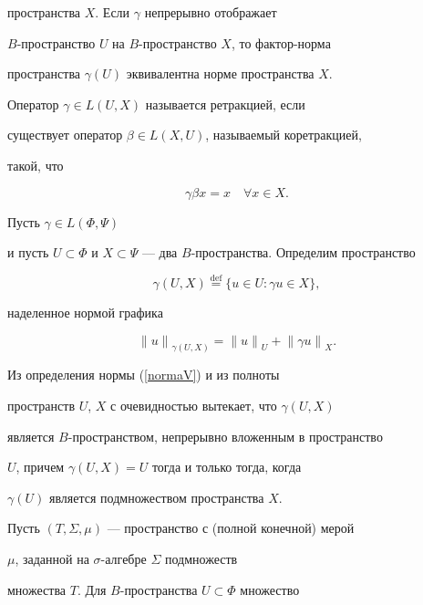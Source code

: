 пространства $X$. Если $\gamma$ непрерывно отображает


$B$-пространство $U$ на $B$-пространство $X$, то фактор-норма


пространства $\gamma (U)$ эквивалентна норме пространства $X$.





Оператор $\gamma \in L(U, X)$ называется ретракцией, если


существует оператор $\beta \in L(X, U)$, называемый коретракцией,


такой, что


$$


\gamma \beta x = x \quad \forall x \in X.


$$





Пусть $\gamma \in L(\Phi, \Psi)$


и пусть $U \subset \Phi$ и $X \subset


\Psi$ --- два $B$-пространства. Определим пространство


$$


\gamma (U, X) \overset{\mathrm{def}}{=}{} \{u \in U: \gamma u \in X\},


$$


наделенное нормой графика


\begin{equation}


{\|u\|}_{\gamma(U,X)} = {\|u\|}_U + {\|\gamma u\|}_X.


\label{normaV}


\end{equation}


Из определения нормы (\ref{normaV}) и из полноты


пространств $U$, $X$ с очевидностью вытекает, что $\gamma(U,X)$


является $B$-пространством, непрерывно вложенным в пространство


$U$, причем $\gamma (U,X) = U$ тогда и только тогда, когда


$\gamma(U)$ является подмножеством пространства $X$.





Пусть $(T, \Sigma, \mu)$ --- пространство с (полной конечной) мерой


$\mu$, заданной на $\sigma$-алгебре $\Sigma$ подмножеств


множества $T$. Для $B$-пространства $U \subset \Phi$ множество


